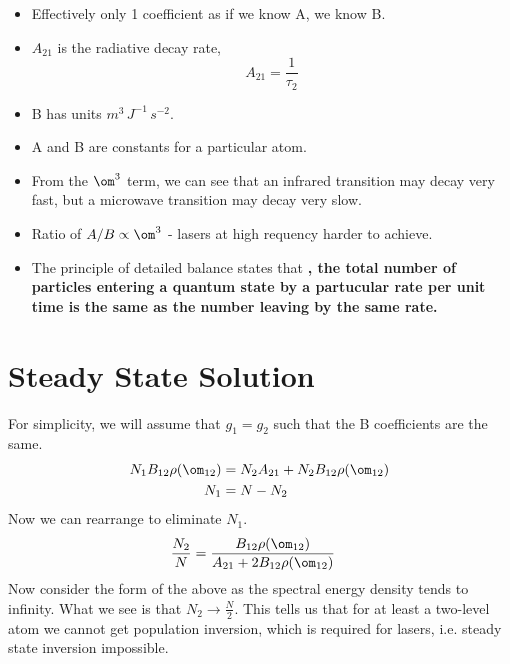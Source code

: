 \documentclass[a4paper, 11pt, normalem]{report}
\begin{document}
\begin{itemize}
    \item Effectively only 1 coefficient as if we know A, we know B. 
    \item $A_{21}$ is the radiative decay rate,
        \begin{equation}
            A_{21} = \frac{1}{\tau_2}
        \end{equation}
    \item B has units $m^3\,J^{-1}\,s^{-2}$.
    \item A and B are constants for a particular atom.
    \item From the $\om^3$ term, we can see that an infrared transition may decay very fast, but a microwave transition may decay very slow. 
    \item Ratio of $A/B \propto \om^3$ - lasers at high requency harder to achieve.
    \item The principle of detailed balance states that \textbf{, the total number of particles entering a quantum state by a partucular rate per unit time is the same as the number leaving by the same rate.}
\end{itemize}

\section{Steady State Solution}
For simplicity, we will assume that $g_1=g_2$ such that the B coefficients are the same. 
\begin{align}
    N_1B_{12}\rho(\om_{12}) &= N_2A_{21} + N_2B_{12}\rho(\om_{12}) \\
    N_1 &= N - N_2
\end{align}
Now we can rearrange to eliminate $N_1$.
\begin{align}
    \frac{N_2}{N} &= \frac{B_{12}\rho(\om_{12})}{A_{21}+2B_{12}\rho(\om_{12})}
\end{align}
Now consider the form of the above as the spectral energy density tends to infinity. 
What we see  is that $N_2 \to \frac{N}{2}$.
This tells us that for at least a two-level atom we cannot get population inversion, which is required for lasers, i.e. steady state inversion impossible.
\end{document}
